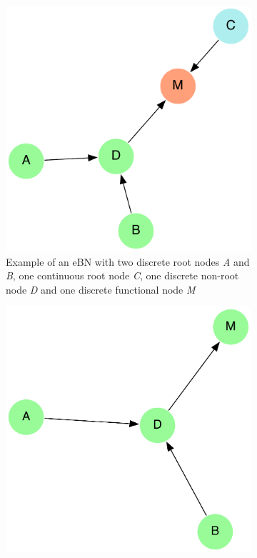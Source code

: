 \begin{figure}[h]
    \centering
    \begin{subfigure}{0.45\textwidth}
        \centering
        \includegraphics[width=\linewidth]{imgs/pdfs/1_ebn.pdf}
        \caption{Example of an eBN with two discrete root nodes \textit{A} and \textit{B}, one continuous root node \textit{C}, one discrete non-root node \textit{D} and one discrete functional node \textit{M}}\label{1_ebn_example}
    \end{subfigure}
    \hfill
    \begin{subfigure}{0.45\textwidth}
        \centering
        \includegraphics[width=\linewidth]{imgs/pdfs/2_rbn.pdf}

\end{subfigure}
\end{figure}
